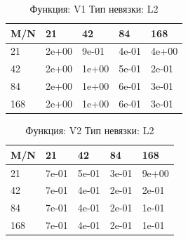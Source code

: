 \documentclass[a4paper,11pt]{article}
\begin{document}
\begin{table}[H]
\caption {Функция: V1 Тип невязки: L2  }
\begin{center}
\begin{tabular}{l|l|l|l|l}
\hline
M/N  & 21 & 42 & 84 & 168 \\ \hline
  21 & 2e+00& 9e-01& 4e-01& 4e+00\\ \hline
  42 & 2e+00& 1e+00& 5e-01& 2e-01\\ \hline
  84 & 2e+00& 1e+00& 6e-01& 3e-01\\ \hline
 168 & 2e+00& 1e+00& 6e-01& 3e-01\\ \hline
\end{tabular}
\end{center}
\end{table}
\begin{table}[H]
\caption {Функция: V2 Тип невязки: L2  }
\begin{center}
\begin{tabular}{l|l|l|l|l}
\hline
M/N  & 21 & 42 & 84 & 168 \\ \hline
  21 & 7e-01& 5e-01& 3e-01& 9e+00\\ \hline
  42 & 7e-01& 4e-01& 2e-01& 2e-01\\ \hline
  84 & 7e-01& 4e-01& 2e-01& 1e-01\\ \hline
 168 & 7e-01& 4e-01& 2e-01& 1e-01\\ \hline
\end{tabular}
\end{center}
\end{table}













\newpage
\end{document}

